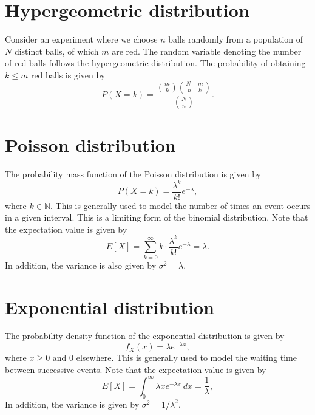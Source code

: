 \documentclass[11pt]{article}
\def\N{\mathbb{N}}
\newcommand\E[1]{E\left[#1\right]}
\theoremstyle{definition}
\theoremstyle{remark}
\numberwithin{equation}{module}
\begin{document}
    \section*{Hypergeometric distribution}
    Consider an experiment where we choose $n$ balls randomly from a population of
    $N$ distinct balls, of which $m$ are red. The random variable denoting the
    number of red balls follows the hypergeometric distribution.  The probability of
    obtaining $k \leq m$ red balls is given by \[
        P(X = k) = \frac{\binom{m}{k}\binom{N - m}{n - k}}{\binom{N}{n}}.
    \] 

    \section*{Poisson distribution}
    The probability mass function of the Poisson distribution is given by \[
        P(X = k) = \frac{\lambda^k}{k!}e^{-\lambda},
    \] where $k \in \N$. This is generally used to model the number of times an
    event occurs in a given interval. This is a limiting form of the binomial
    distribution. Note that the expectation value is given by \[
        \E{X} = \sum_{k = 0}^\infty k\cdot \frac{\lambda^k}{k!}e^{-\lambda} =
        \lambda.
    \] In addition, the variance is also given by $\sigma^2 = \lambda$.

    \section*{Exponential distribution}
    The probability density function of the exponential distribution is given by \[
        f_X(x) = \lambda e^{-\lambda x}, 
    \] where $x \geq 0$ and $0$ elsewhere.
    This is generally used to model the waiting time between successive events.
    Note that the expectation value is given by \[
        \E{X} = \int_0^\infty \lambda x e^{-\lambda x}\:dx = \frac{1}{\lambda},
    \] In addition, the variance is given by $\sigma^2 = 1 /\lambda^2$.
\end{document}
